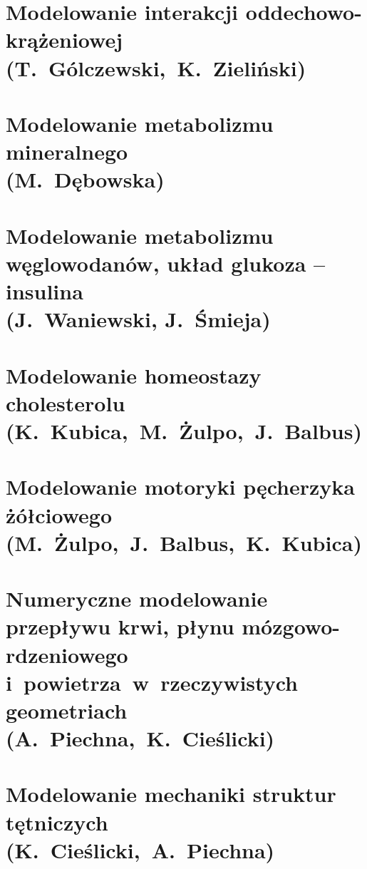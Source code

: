 \documentclass[11pt,a4paper,twoside,openright,final]{memoir}
\begin{document}
			\chapter[Modelowanie interakcji oddechowo-krążeniowej]{Modelowanie interakcji oddechowo-krążeniowej\\{\large (T.~Gólczewski,~K.~Zieliński)}}
			
			\chapter[Modelowanie metabolizmu mineralnego]{Modelowanie metabolizmu mineralnego\\{\large (M.~Dębowska)}}
			
			\chapter[Modelowanie metabolizmu węglowodanów, układ glukoza – insulina]{Modelowanie metabolizmu węglowodanów, układ glukoza – insulina\\{\large (J.~Waniewski, J.~Śmieja)}}
			
			\chapter[Modelowanie homeostazy cholesterolu]{Modelowanie homeostazy cholesterolu\\{\large (K.~Kubica,~M.~Żulpo,~J.~Balbus)}}
			
			\chapter[Modelowanie motoryki pęcherzyka żółciowego]{Modelowanie motoryki pęcherzyka żółciowego\\{\large (M.~Żulpo,~J.~Balbus,~K.~Kubica)}}
			
			\chapter[Numeryczne modelowanie przepływu krwi, płynu mózgowo-rdzeniowego i~powietrza w rzeczywistych geometriach]{Numeryczne modelowanie przepływu krwi, płynu mózgowo-rdzeniowego i~powietrza~w~rzeczywistych geometriach\\{\large (A.~Piechna,~K.~Cieślicki)}}
			
			\chapter[Modelowanie mechaniki struktur tętniczych]{Modelowanie mechaniki struktur tętniczych\\{\large (K.~Cieślicki,~A.~Piechna)}}
			
\end{document}
